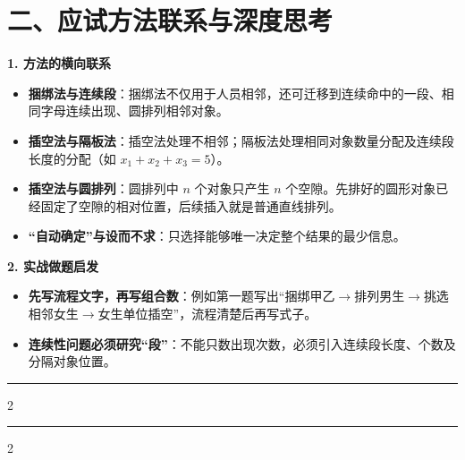 \documentclass[11pt,a4paper]{ctexart}
\begin{document}
\section*{二、应试方法联系与深度思考}

\textbf{1. 方法的横向联系}
\begin{itemize}[itemsep=0.3em]
    \item \textbf{捆绑法与连续段}：捆绑法不仅用于人员相邻，还可迁移到连续命中的一段、相同字母连续出现、圆排列相邻对象。
    \item \textbf{插空法与隔板法}：插空法处理不相邻；隔板法处理相同对象数量分配及连续段长度的分配（如 $x_1+x_2+x_3=5$）。
    \item \textbf{插空法与圆排列}：圆排列中 $n$ 个对象只产生 $n$ 个空隙。先排好的圆形对象已经固定了空隙的相对位置，后续插入就是普通直线排列。
    \item \textbf{“自动确定”与设而不求}：只选择能够唯一决定整个结果的最少信息。
\end{itemize}

\textbf{2. 实战做题启发}
\begin{itemize}[itemsep=0.3em]
    \item \textbf{先写流程文字，再写组合数}：例如第一题写出“捆绑甲乙$\to$排列男生$\to$挑选相邻女生$\to$女生单位插空”，流程清楚后再写式子。
    \item \textbf{连续性问题必须研究“段”}：不能只数出现次数，必须引入连续段长度、个数及分隔对象位置。
\end{itemize}

\vspace{1em}
\hrule
\vspace{1.5em}

{\small \qProbPermExactAdjStem}
\vspace{0.5em}
\begin{paracol}{2}
\switchcolumn
{}
\end{paracol}

\vspace{1.5em}
\hrule
\vspace{1.5em}

{\small \qProbPermMultiForbidStem}
\vspace{0.5em}
\begin{paracol}{2}
\switchcolumn
{}
\end{paracol}
\end{document}
